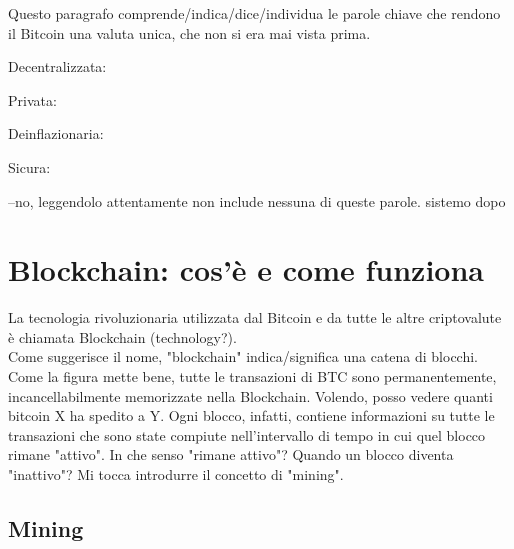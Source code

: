 \documentclass {article}
\begin{document}
Questo paragrafo comprende/indica/dice/individua le parole chiave che rendono il Bitcoin una valuta unica, che non si era mai vista prima.

Decentralizzata:

Privata:

Deinflazionaria:

Sicura:

--no, leggendolo attentamente non include nessuna di queste parole. sistemo dopo


\section {Blockchain: cos'è e come funziona}


La tecnologia rivoluzionaria utilizzata dal Bitcoin e da tutte le altre criptovalute è chiamata Blockchain (technology?).\\
Come suggerisce il nome, "blockchain" indica/significa una catena di blocchi.
Come la figura mette bene, tutte le transazioni di BTC sono permanentemente, incancellabilmente memorizzate nella Blockchain.
Volendo, posso vedere quanti bitcoin X ha spedito a Y. Ogni blocco, infatti, contiene informazioni su tutte le transazioni che sono state compiute nell'intervallo di tempo in cui quel blocco rimane "attivo".
In che senso "rimane attivo"? Quando un blocco diventa "inattivo"?
Mi tocca introdurre il concetto di "mining".


\subsection {Mining}
\end{document}
